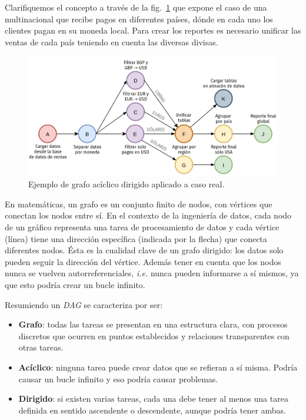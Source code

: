 \documentclass[a4paper,12pt]{article}
\begin{document}
		Clarifiquemos el concepto a través de la fig.~\ref{fig:dag} que expone el caso de una multinacional que recibe pagos en diferentes países, dónde en cada uno los clientes pagan en su moneda local. Para crear los reportes es necesario unificar las ventas de cada país teniendo en cuenta las diversas divisas.
				
		\begin{figure}[H]
			\begin{center}				
				\includegraphics[width=1\textwidth]{dag.png}
				\caption{Ejemplo de grafo acíclico dirigido aplicado a caso real.}
				\label{fig:dag}
			\end{center}
		\end{figure}
				
		En matemáticas, un grafo es un conjunto finito de nodos, con vértices que conectan los nodos entre sí. En el contexto de la ingeniería de datos, cada nodo de un gráfico representa una tarea de procesamiento de datos y cada vértice (línea) tiene una dirección específica (indicada por la flecha) que conecta diferentes nodos. Ésta es la cualidad clave de un grafo dirigido: los datos solo pueden seguir la dirección del vértice. Además tener en cuenta que los nodos nunca se vuelven autorreferenciales, \textit{i.e.} nunca pueden informarse a sí mismos, ya que esto podría crear un bucle infinito.
				
		Resumiendo un \textit{DAG} se caracteriza por ser:
		\begin{itemize}[noitemsep, topsep=2pt]
			\item \textbf{Grafo}: todas las tareas se presentan en una estructura clara, con procesos discretos que ocurren en puntos establecidos y relaciones transparentes con otras tareas.
			\item \textbf{Acíclico}: ninguna tarea puede crear datos que se refieran a sí misma. Podría causar un bucle infinito y eso podría causar problemas.
			\item \textbf{Dirigido}: si existen varias tareas, cada una debe tener al menos una tarea definida en sentido ascendente o descendente, aunque podría tener ambas.
		\end{itemize}
				
\end{document}
